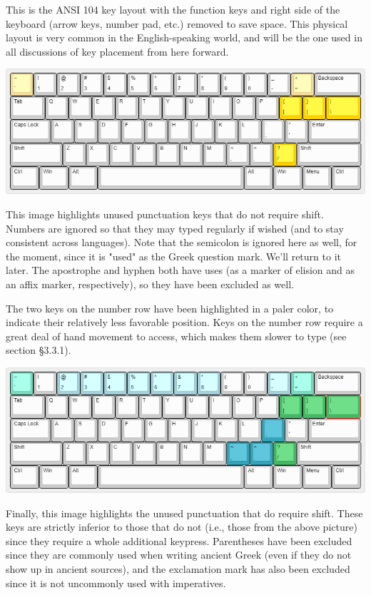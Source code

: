 \documentclass[11pt]{article}
\begin{document}
This is the ANSI 104 key layout with the function keys and right side of the keyboard (arrow keys, number pad, etc.) removed to save space. This physical layout is very common in the English-speaking world, and will be the one used in all discussions of key placement from here forward.

\begin{center}
\includegraphics[width=.9\linewidth]{./images/unused-no-shift.png}
\end{center}

This image highlights unused punctuation keys that do not require shift. Numbers are ignored so that they may typed regularly if wished (and to stay consistent across languages). Note that the semicolon is ignored here as well, for the moment, since it is "used" as the Greek question mark. We'll return to it later. The apostrophe and hyphen both have uses (as a marker of elision and as an affix marker, respectively), so they have been excluded as well.

The two keys on the number row have been highlighted in a paler color, to indicate their relatively less favorable position. Keys on the number row require a great deal of hand movement to access, which makes them slower to type (see section §3.3.1).

\begin{center}
\includegraphics[width=.9\linewidth]{./images/unused-shift.png}
\end{center}

Finally, this image highlights the unused punctuation that do require shift. These keys are strictly inferior to those that do not (i.e., those from the above picture) since they require a whole additional keypress. Parentheses have been excluded since they are commonly used when writing ancient Greek (even if they do not show up in ancient sources), and the exclamation mark has also been excluded since it is not uncommonly used with imperatives.
\end{document}
